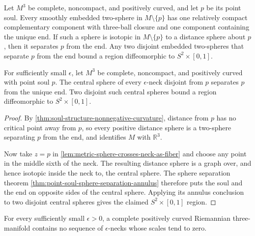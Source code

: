 \begin{theorem}
\label{thm:point-soul-sphere-separation-annulus}
\notready
Let $M^3$ be complete, noncompact, and positively curved, and let $p$ be its
point soul.  Every smoothly embedded two-sphere in $M\setminus\{p\}$ has one
relatively compact complementary component with three-ball closure and one
component containing the unique end.  If such a sphere is isotopic in
$M\setminus\{p\}$ to a distance sphere about $p$, then it separates $p$ from
the end.  Any two disjoint embedded two-spheres that separate $p$ from the
end bound a region diffeomorphic to $S^2\times[0,1]$.
\end{theorem}

\begin{lemma}
\label{lem:positive-curvature-neck-separation}
\notready
For sufficiently small $\epsilon$, let $M^3$ be complete, noncompact, and
positively curved with point soul $p$.  The central sphere of every
$\epsilon$-neck disjoint from $p$ separates $p$ from the unique end.  Two
disjoint such central spheres bound a region diffeomorphic to
$S^2\times[0,1]$.
\end{lemma}

\begin{proof}
By \ref{thm:soul-structure-nonnegative-curvature}, distance from $p$ has no
critical point away from $p$, so every positive distance sphere is a
two-sphere separating $p$ from the end, and identifies $M$ with
$\mathbb R^3$.

Now take $z=p$ in
\ref{lem:metric-sphere-crosses-neck-as-fiber} and choose any point in the
middle sixth of the neck.  The resulting distance sphere is a graph over,
and hence isotopic inside the neck to, the central sphere.  The sphere
separation theorem \ref{thm:point-soul-sphere-separation-annulus} therefore
puts the soul and the end on opposite sides of the central sphere.  Applying
its annulus conclusion to two disjoint central spheres gives the claimed
$S^2\times[0,1]$ region.
\end{proof}

\begin{proposition}
\label{prop:positive-curvature-neck-scale-lower-bound}
\notready
For every sufficiently small $\epsilon>0$, a complete positively curved
Riemannian three-manifold contains no sequence of $\epsilon$-necks whose
scales tend to zero.
\end{proposition}

